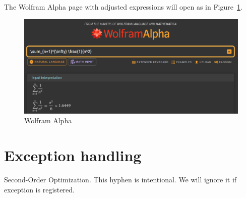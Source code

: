 \documentclass[a4paper, 10pt]{article}
\begin{document}
The Wolfram Alpha page with adjusted expressions will open as in Figure~\ref{fig:2}.
\begin{figure}[htbp]
    \centering
    \includegraphics[width=\columnwidth]{../images/askWolframAlpha3.png}
    \caption{Wolfram Alpha}
    \label{fig:2}
\end{figure}

\section{
  Exception handling
 }

Second-Order Optimization.
This hyphen is intentional.
We will ignore it if exception is registered.
\end{document}
